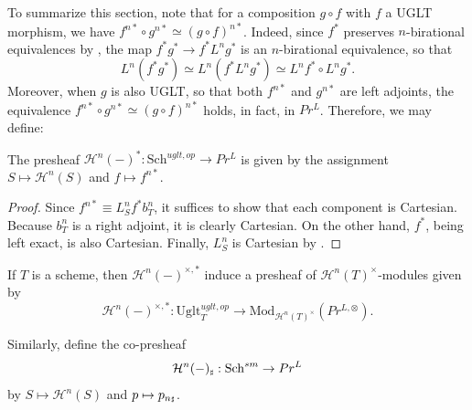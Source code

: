 To summarize this section, note that for a composition $g\circ f$ with $f$ a UGLT morphism, we have $f^{n*}\circ g^{n*}\simeq (g\circ f)^{n*}$. Indeed, since $f^*$ preserves $n$-birational equivalences by , the map $f^*g^*\to f^*L^ng^*$ is an $n$-birational equivalence, so that $$L^n(f^*g^*)\simeq L^n(f^*L^ng^*)\simeq L^nf^*\circ L^ng^*.$$ Moreover, when $g$ is also UGLT, so that both $f^{n*}$ and $g^{n*}$ are left adjoints, the equivalence $f^{n*}\circ g^{n*}\simeq (g\circ f)^{n*}$ holds, in fact, in $Pr^L$. Therefore, we may define:
    \begin{defn}
The presheaf $\mathcal{H}^{n}(-)^*: \mathrm{Sch}^{uglt,op}_{}\to Pr^L$ is given by the assignment $S\mapsto \mathcal{H}^{n}(S)$ and $f\mapsto f^{n*}$. 
\end{defn}
\begin{proof}
Since $f^{n*}\equiv L^n_Sf^*b^n_T$, it suffices to show that each component is Cartesian. Because $b_T^n$ is a right adjoint, it is clearly Cartesian. On the other hand, $f^*$, being left exact, is also Cartesian. Finally, $L^n_S$ is Cartesian by .
\end{proof}
\begin{cor}\label{cart pull functoriality}
    If $T$ is a scheme, then $\mathcal{H}^{n} (-)^{\times,*}$ induce a presheaf of $\mathcal{H}^n(T)^\times $-modules given by $$\mathcal{H}^{n} (-)^{\times,*}:\mathrm{Uglt}_T^{uglt,op}\to \mathrm{Mod}_{\mathcal{H}^{n}(T)^{\times}}(Pr^{L,\otimes}).$$
\end{cor}
\begin{defn}
    Similarly, define the co-presheaf $$\mathcal{H}^n(-)_{\mathord{\text{\tiny $\sharp$}}}: \mathrm{Sch}^{sm}\to Pr^L$$ by $S\mapsto \mathcal{H}^{n}(S)$ and $p\mapsto p_{n{\mathord{\text{\tiny $\sharp$}}}}$.
\end{defn}
